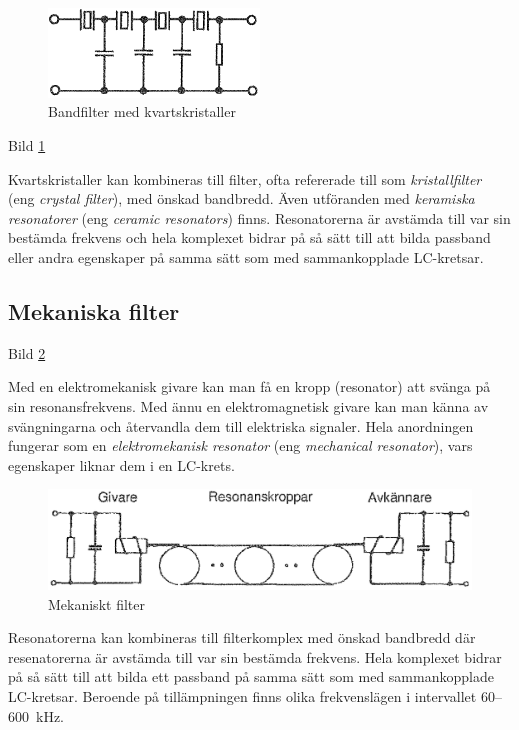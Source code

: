 \begin{figure}
\includegraphics[width=0.5\textwidth]{images/bild_2_3-29.png}
\caption{Bandfilter med kvartskristaller}
\label{fig:BildII3-29}
\end{figure}

Bild \ref{fig:BildII3-29}

Kvartskristaller kan kombineras till filter, ofta refererade till som
\emph{kristallfilter} (eng \emph{crystal filter}), med önskad bandbredd. Även
utföranden med \emph{keramiska resonatorer} (eng \emph{ceramic resonators})
finns. Resonatorerna är avstämda till var sin bestämda frekvens och hela
komplexet bidrar på så sätt till att bilda passband eller andra egenskaper på
samma sätt som med sammankopplade LC-kretsar.

\subsection{Mekaniska filter}

Bild \ref{fig:BildII3-30}

Med en elektromekanisk givare kan man få en kropp (resonator) att svänga på sin
resonansfrekvens. Med ännu en elektromagnetisk givare kan man känna av
svängningarna och återvandla dem till elektriska signaler. Hela anordningen
fungerar som en \emph{elektromekanisk resonator} (eng
\emph{mechanical resonator}), vars egenskaper liknar dem i en LC-krets.

\begin{figure}
\includegraphics[width=\textwidth]{images/bild_2_3-30.png}
\caption{Mekaniskt filter}
\label{fig:BildII3-30}
\end{figure}

Resonatorerna kan kombineras till filterkomplex med önskad bandbredd där
resenatorerna är avstämda till var sin bestämda frekvens. Hela komplexet bidrar
på så sätt till att bilda ett passband på samma sätt som med sammankopplade
LC-kretsar. Beroende på tillämpningen finns olika frekvenslägen i intervallet
60--600~kHz.

